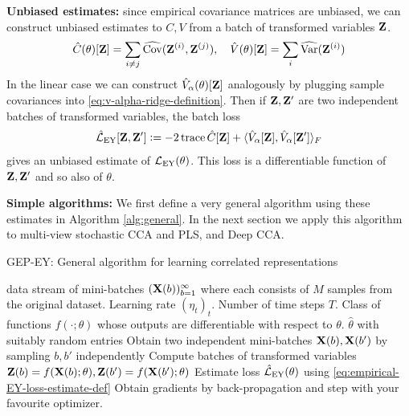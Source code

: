 \textbf{Unbiased estimates:}
since empirical covariance matrices are unbiased, we can construct unbiased estimates to $C, V$ from a batch of transformed variables $\mathbf{Z}$.
\begin{align}\label{eq:def-C-V-matrices-empirical}
\hat{C}(\theta)[\mathbf{Z}] = \sum_{i \neq j} \widehat{\mathrm{Cov}}(\mathbf{Z}^{(i)}, \mathbf{Z}^{(j)}), \quad
\hat{V}(\theta)[\mathbf{Z}] = \sum_{i} \widehat{\mathrm{Var}}(\mathbf{Z}^{(i)})
\end{align}
In the linear case we can construct $\hat{V}_\alpha(\theta)[\mathbf{Z}]$ analogously by plugging sample covariances into \cref{eq:v-alpha-ridge-definition}.
Then if $\mathbf{Z}, \mathbf{Z}'$ are two independent batches of transformed variables, the batch loss
\begin{align}\label{eq:empirical-EY-loss-estimate-def}
\hat{\mathcal{L}}_\text{EY}[\mathbf{Z}, \mathbf{Z}'] \vcentcolon= - 2 \operatorname{trace} \hat{C}[\mathbf{Z}] + \langle \hat{V}_\alpha[\mathbf{Z}], \hat{V}_\alpha[\mathbf{Z}'] \rangle_F
\end{align}
gives an unbiased estimate of $\mathcal{L}_\text{EY}(\theta)$.%
This loss is a differentiable function of $\mathbf{Z}, \mathbf{Z}'$ and so also of $\theta$.

\textbf{Simple algorithms:}
We first define a very general algorithm using these estimates in Algorithm \ref{alg:general}.
In the next section we apply this algorithm to multi-view stochastic CCA and PLS, and Deep CCA.

\begin{algorithm}
    \caption{GEP-EY: General algorithm for learning correlated representations}
    \label{alg:general}
    \begin{algorithmic}
         data stream of mini-batches $(\mathbf{X}(b))_{b=1}^\infty$ where each consists of $M$ samples from the original dataset. Learning rate $(\eta_t)_t$. Number of time steps $T$. Class of functions $f(\cdot; \theta)$ whose outputs are differentiable with respect to $\theta$.
         $\hat{\theta}$ with suitably random entries
        \STATE Obtain two independent mini-batches \( \mathbf{X}(b), \mathbf{X}(b') \) by sampling \( b, b' \) independently
        \STATE Compute batches of transformed variables $\mathbf{Z}(b) = f(\mathbf{X}(b); \theta), \mathbf{Z}(b') = f(\mathbf{X}(b'); \theta)$
        \STATE Estimate loss $\hat{\mathcal{L}}_\text{EY}(\theta)$ using \cref{eq:empirical-EY-loss-estimate-def}
        \STATE Obtain gradients by back-propagation and step with your favourite optimizer.
        \ENDFOR
    \end{algorithmic}
\end{algorithm}

